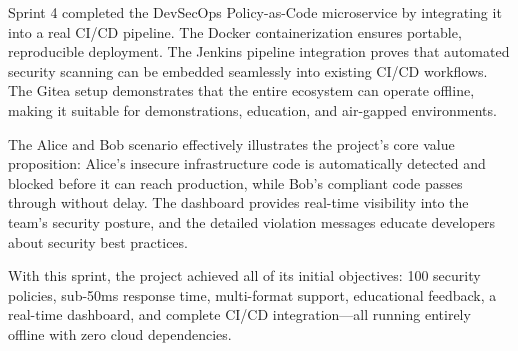 Sprint 4 completed the DevSecOps Policy-as-Code microservice by integrating it into a real CI/CD pipeline. The Docker containerization ensures portable, reproducible deployment. The Jenkins pipeline integration proves that automated security scanning can be embedded seamlessly into existing CI/CD workflows. The Gitea setup demonstrates that the entire ecosystem can operate offline, making it suitable for demonstrations, education, and air-gapped environments.

The Alice and Bob scenario effectively illustrates the project's core value proposition: Alice's insecure infrastructure code is automatically detected and blocked before it can reach production, while Bob's compliant code passes through without delay. The dashboard provides real-time visibility into the team's security posture, and the detailed violation messages educate developers about security best practices.

With this sprint, the project achieved all of its initial objectives: 100 security policies, sub-50ms response time, multi-format support, educational feedback, a real-time dashboard, and complete CI/CD integration—all running entirely offline with zero cloud dependencies.
